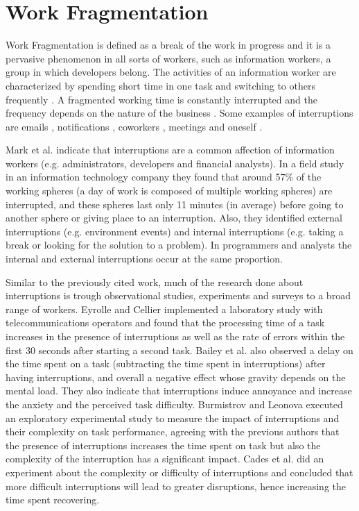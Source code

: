 \section{Work Fragmentation}
Work Fragmentation is defined as a break of the work in progress and it is a pervasive phenomenon in all sorts of workers, such as information workers, a group in which developers belong. The activities of an information worker are characterized by spending short time in one task and switching to others frequently \cite{MGH05}. A fragmented working time is constantly interrupted and the frequency depends on the nature of the business \cite{T99}. Some examples of interruptions are emails \cite{BJE05}, notifications \cite{CCH01}, coworkers \cite{LVD06}, meetings \cite{LR05} and oneself \cite{MGH05}.

Mark et al. \cite{MGH05} indicate that interruptions are a common affection of information workers (e.g. administrators, developers and financial analysts). In a field study in an information technology company they found that around 57\% of the working spheres (a day of work is composed of multiple working spheres) are interrupted, and these spheres last only 11 minutes (in average) before going to another sphere or giving place to an interruption. Also, they identified external interruptions (e.g. environment events) and internal interruptions (e.g. taking a break or looking for the solution to a problem). In programmers and analysts the internal and external interruptions occur at the same proportion.

Similar to the previously cited work, much of the research done about interruptions is trough observational studies, experiments and surveys to a broad range of workers. Eyrolle and Cellier \cite{EC00} implemented a laboratory study with telecommunications operators and found that the processing time of a task increases in the presence of interruptions as well as the rate of errors within the first 30 seconds after starting a second task. Bailey et al. \cite{BKC01} also observed a delay on the time spent on a task (subtracting the time spent in interruptions) after having interruptions, and overall a negative effect whose gravity depends on the mental load. They also indicate that interruptions induce annoyance and increase the anxiety and the perceived task difficulty. Burmistrov and Leonova \cite{BL96} executed an exploratory experimental study to measure the impact of interruptions and their complexity on task performance, agreeing with the previous authors that the presence of interruptions increases the time spent on task but also the complexity of the interruption has a significant impact. Cades et al. \cite{CDT07} did an experiment about the complexity or difficulty of interruptions and concluded that more difficult interruptions will lead to greater disruptions, hence increasing the time spent recovering.

